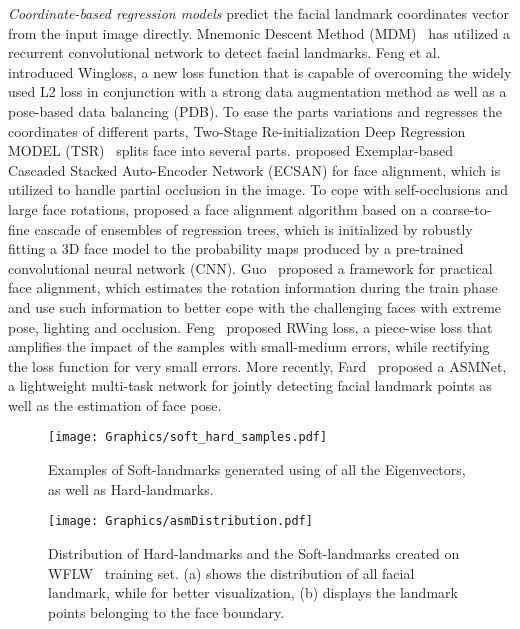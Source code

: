 \documentclass[times,twocolumn,final,authoryear]{elsarticle}
\begin{document}
\textit{Coordinate-based regression models} predict the facial landmark coordinates vector from the input image directly. Mnemonic Descent Method (MDM)~\cite{trigeorgis2016mnemonic} has utilized a recurrent convolutional network to detect facial landmarks. Feng et al.~\cite{feng2018wing} introduced Wingloss, a new loss function that is capable of overcoming the widely used L2 loss in conjunction with a strong data augmentation method as well as a pose-based data balancing (PDB). To ease the parts variations and regresses the coordinates of different parts, Two-Stage Re-initialization Deep Regression MODEL (TSR)~\cite{lv2017deep} splits face into several parts. \cite{zhang2018exemplar} proposed Exemplar-based Cascaded Stacked Auto-Encoder Network (ECSAN) for face alignment, which is utilized to handle partial occlusion in the image. To cope with self-occlusions and large face rotations, \cite{valle2019face} proposed a face alignment algorithm based on a coarse-to-fine cascade of ensembles of regression trees, which is initialized by robustly fitting a 3D face model to the probability maps produced by a pre-trained convolutional neural network (CNN). Guo~\cite{guo2019pfld} proposed a framework for practical face alignment, which estimates the rotation information during the train phase and use such information to better cope with the challenging faces with extreme pose, lighting and occlusion. Feng~\cite{feng2020rectified} proposed RWing loss, a piece-wise loss that amplifies the impact of the samples with small-medium errors, while rectifying the loss function for very small errors. More recently, Fard~\cite{fard2021asmnet} proposed a ASMNet, a lightweight multi-task network for jointly detecting facial landmark points as well as the estimation of face pose.

\begin{figure}[t!]
  \centering
  \texttt{[image: Graphics/soft\_hard\_samples.pdf]}
  \caption{Examples of Soft-landmarks generated using  of all the Eigenvectors, as well as Hard-landmarks.}
  \label{fig:soft_hard_samples}
\end{figure}


\begin{figure}[t]
  \centering
  \texttt{[image: Graphics/asmDistribution.pdf]}
  \caption{Distribution of Hard-landmarks and the Soft-landmarks created on WFLW~\cite{wu2018look} training set. (a) shows the distribution of all facial landmark, while for better visualization, (b) displays the landmark points belonging to the face boundary.}
  \label{fig:asm-Distribution}
\end{figure}
\end{document}
